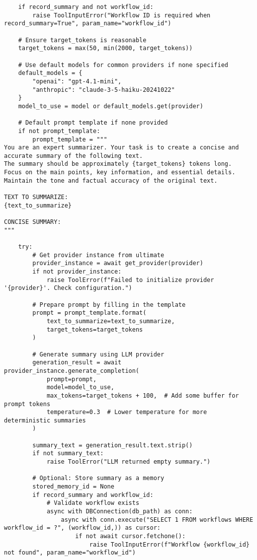 \documentclass[12pt,a4paper]{article}
\begin{document}
\begin{pageablecode}
\begin{verbatim}
    if record_summary and not workflow_id:
        raise ToolInputError("Workflow ID is required when record_summary=True", param_name="workflow_id")
    
    # Ensure target_tokens is reasonable
    target_tokens = max(50, min(2000, target_tokens))
    
    # Use default models for common providers if none specified
    default_models = {
        "openai": "gpt-4.1-mini",
        "anthropic": "claude-3-5-haiku-20241022"
    }
    model_to_use = model or default_models.get(provider)
    
    # Default prompt template if none provided
    if not prompt_template:
        prompt_template = """
You are an expert summarizer. Your task is to create a concise and accurate summary of the following text.
The summary should be approximately {target_tokens} tokens long.
Focus on the main points, key information, and essential details.
Maintain the tone and factual accuracy of the original text.

TEXT TO SUMMARIZE:
{text_to_summarize}

CONCISE SUMMARY:
"""
    
    try:
        # Get provider instance from ultimate
        provider_instance = await get_provider(provider)
        if not provider_instance:
            raise ToolError(f"Failed to initialize provider '{provider}'. Check configuration.")
        
        # Prepare prompt by filling in the template
        prompt = prompt_template.format(
            text_to_summarize=text_to_summarize,
            target_tokens=target_tokens
        )
        
        # Generate summary using LLM provider
        generation_result = await provider_instance.generate_completion(
            prompt=prompt,
            model=model_to_use,
            max_tokens=target_tokens + 100,  # Add some buffer for prompt tokens
            temperature=0.3  # Lower temperature for more deterministic summaries
        )
        
        summary_text = generation_result.text.strip()
        if not summary_text:
            raise ToolError("LLM returned empty summary.")
        
        # Optional: Store summary as a memory
        stored_memory_id = None
        if record_summary and workflow_id:
            # Validate workflow exists
            async with DBConnection(db_path) as conn:
                async with conn.execute("SELECT 1 FROM workflows WHERE workflow_id = ?", (workflow_id,)) as cursor:
                    if not await cursor.fetchone():
                        raise ToolInputError(f"Workflow {workflow_id} not found", param_name="workflow_id")
                

\end{verbatim}
\end{pageablecode}
\end{document}
